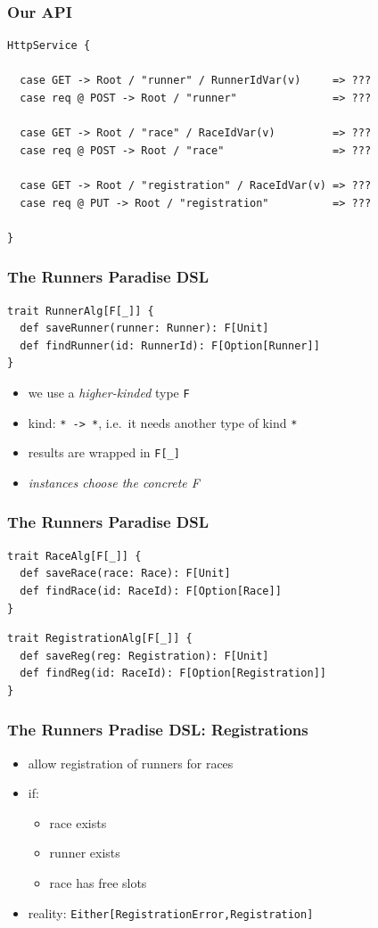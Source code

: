 \documentclass{beamer}
\begin{document}
\begin{frame}[fragile]
  \frametitle{Our API}
\begin{verbatim}
HttpService {

  case GET -> Root / "runner" / RunnerIdVar(v)     => ???
  case req @ POST -> Root / "runner"               => ???

  case GET -> Root / "race" / RaceIdVar(v)         => ???
  case req @ POST -> Root / "race"                 => ???

  case GET -> Root / "registration" / RaceIdVar(v) => ???
  case req @ PUT -> Root / "registration"          => ???

}
\end{verbatim}
\end{frame}

\begin{frame}[fragile]
  \frametitle{The Runners Paradise DSL}
\begin{verbatim}
trait RunnerAlg[F[_]] {
  def saveRunner(runner: Runner): F[Unit]
  def findRunner(id: RunnerId): F[Option[Runner]]
}
\end{verbatim}
  \begin{itemize}
  \item we use a \textit{higher-kinded} type \texttt{F}
  \item kind: \texttt{* -> *}, i.e.\ it needs another type of kind
    \texttt{*}
  \item results are wrapped in \texttt{F[\_]}
  \item \textit{instances choose the concrete F}
  \end{itemize}
\end{frame}

\begin{frame}[fragile]
  \frametitle{The Runners Paradise DSL}
\begin{verbatim}
trait RaceAlg[F[_]] {
  def saveRace(race: Race): F[Unit]
  def findRace(id: RaceId): F[Option[Race]]
}
\end{verbatim}
\begin{verbatim}
trait RegistrationAlg[F[_]] {
  def saveReg(reg: Registration): F[Unit]
  def findReg(id: RaceId): F[Option[Registration]]
}
\end{verbatim}
\end{frame}

\begin{frame}
  \frametitle{The Runners Pradise DSL: Registrations}
  \begin{itemize}
  \item allow registration of runners for races
  \item if:
    \begin{itemize}
    \item race exists
    \item runner exists
    \item race has free slots
    \end{itemize}
  \item reality: \texttt{Either[RegistrationError,Registration]}
  \end{itemize}
\end{frame}
\end{document}

